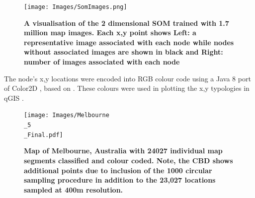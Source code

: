 \documentclass{nature}
\begin{document}
\begin{figure}
\centering    
\texttt{[image: Images/SomImages.png]}  
\caption{\bf  A visualisation of the 2 dimensional SOM trained with 1.7 million map images.  Each x,y point shows Left: a representative image associated with each node while nodes without associated images are shown in black and Right: number of images associated with each node}    
 \label{fig:somresults}  
\end{figure} 



The node's x,y locations were encoded into RGB colour code using a Java 8 port of Color2D  \cite{Jackle2017}, based on \cite{Steiger2015}. These colours were used in plotting the x,y typologies in qGIS \cite{QGIS2009}.


\begin{figure}
\centering    
\texttt{[image: Images/Melbourne\\\_5\\\_Final.pdf]}  
\caption{\bf  Map of Melbourne, Australia with 24027 individual map segments classified and colour coded. Note, the CBD shows additional points due to inclusion of the 1000 circular sampling procedure in addition to the 23,027 locations sampled at 400m resolution. }    
 \label{fig:mel23000}  
\end{figure} 









 





\end{document}
